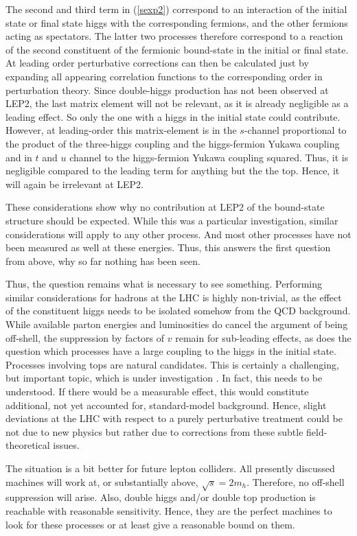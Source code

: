 \documentclass[final,12pt]{article}
\newcommand*{\pref}[1]{(\ref{#1})}
\newcommand*{\1}{1\!\!\!\bot}
\begin{document}
The second and third term in \pref{sexp2} correspond to an interaction of the initial state or final state higgs with the corresponding fermions, and the other fermions acting as spectators. The latter two processes therefore correspond to a reaction of the second constituent of the fermionic bound-state in the initial or final state. At leading order perturbative corrections can then be calculated just by expanding all appearing correlation functions to the corresponding order in perturbation theory. Since double-higgs production has not been observed at LEP2, the last matrix element will not be relevant, as it is already negligible as a leading effect. So only the one with a higgs in the initial state could contribute. However, at leading-order this matrix-element is in the $s$-channel proportional to the product of the three-higgs coupling and the higgs-fermion Yukawa coupling and in $t$ and $u$ channel to the higgs-fermion Yukawa coupling squared. Thus, it is negligible compared to the leading term for anything but the the top. Hence, it will again be irrelevant at LEP2.

These considerations show why no contribution at LEP2 of the bound-state structure should be expected. While this was a particular investigation, similar considerations will apply to any other process. And most other processes have not been measured as well at these energies. Thus, this answers the first question from above, why so far nothing has been seen.

Thus, the question remains what is necessary to see something. Performing similar considerations for hadrons at the LHC is highly non-trivial, as the effect of the constituent higgs needs to be isolated somehow from the QCD background. While available parton energies and luminosities do cancel the argument of being off-shell, the suppression by factors of $v$ remain for sub-leading effects, as does the question which processes have a large coupling to the higgs in the initial state. Processes involving tops are natural candidates. This is certainly a challenging, but important topic, which is under investigation \cite{Fernbach:unpublished}. In fact, this needs to be understood. If there would be a measurable effect, this would constitute additional, not yet accounted for, standard-model background. Hence, slight deviations at the LHC with respect to a purely perturbative treatment could be not due to new physics but rather due to corrections from these subtle field-theoretical issues.

The situation is a bit better for future lepton colliders. All presently discussed machines will work at, or substantially above, $\sqrt{s}=2m_h$. Therefore, no off-shell suppression will arise. Also, double higgs and/or double top production is reachable with reasonable sensitivity. Hence, they are the perfect machines to look for these processes or at least give a reasonable bound on them.
\end{document}
